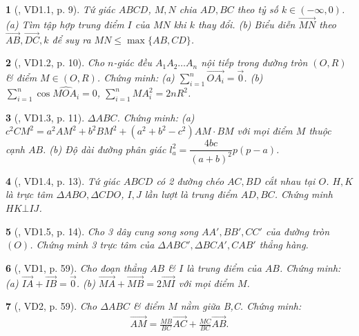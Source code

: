 \documentclass{article}
\newtheorem{baitoan}{}
\begin{document}
\begin{baitoan}[\cite{Pho_Dung_chuyen_de_Toan_PT_1}, VD1.1, p. 9]
	Tứ giác $ABCD$, $M,N$ chia $AD,BC$ theo tỷ số $k\in(-\infty,0)$. (a) Tìm tập hợp trung điểm $I$ của $MN$ khi $k$ thay đổi. (b) Biểu diễn $\overrightarrow{MN}$ theo $\overrightarrow{AB},\overrightarrow{DC},k$ để suy ra $MN\le\max\{AB,CD\}$.
\end{baitoan}

\begin{baitoan}[\cite{Pho_Dung_chuyen_de_Toan_PT_1}, VD1.2, p. 10]
	Cho $n$-giác đều $A_1A_2\ldots A_n$ nội tiếp trong đường tròn $(O,R)$ \& điểm $M\in(O,R)$. Chứng minh: (a) $\sum_{i=1}^n \overrightarrow{OA_i} = \vec{0}$. (b) $\sum_{i=1}^n \cos\widehat{MOA_i} = 0$, $\sum_{i=1}^n MA_i^2 = 2nR^2$.
\end{baitoan}

\begin{baitoan}[\cite{Pho_Dung_chuyen_de_Toan_PT_1}, VD1.3, p. 11]
	$\Delta ABC$. Chứng minh: (a) $c^2 CM^2 = a^2AM^2 + b^2BM^2 + (a^2 + b^2 - c^2)AM\cdot BM$ với mọi điểm $M$ thuộc cạnh $AB$. (b) Độ dài đường phân giác $l_a^2 = \dfrac{4bc}{(a + b)^2}p(p - a)$.
\end{baitoan}

\begin{baitoan}[\cite{Pho_Dung_chuyen_de_Toan_PT_1}, VD1.4, p. 13]
	Tứ giác $ABCD$ có 2 đường chéo $AC,BD$ cắt nhau tại $O$. $H,K$ là trực tâm $\Delta ABO,\Delta CDO$, $I,J$ lần lượt là trung điểm $AD,BC$. Chứng minh $HK\bot IJ$.
\end{baitoan}

\begin{baitoan}[\cite{Pho_Dung_chuyen_de_Toan_PT_1}, VD1.5, p. 14]
	Cho 3 dây cung song song $AA',BB',CC'$ của đường tròn $(O)$. Chứng minh 3 trực tâm của $\Delta ABC',\Delta BCA',CAB'$ thẳng hàng.
\end{baitoan}

\begin{baitoan}[\cite{Hai_Hung_Thu_Tung2022_tap_1}, VD1, p. 59]
	Cho đoạn thẳng $AB$ \& $I$ là trung điểm của $AB$. Chứng minh: (a) $\overrightarrow{IA} + \overrightarrow{IB} = \vec{0}$. (b)  $\overrightarrow{MA} + \overrightarrow{MB} = 2\overrightarrow{MI}$ với mọi điểm $M$.
\end{baitoan}

\begin{baitoan}[\cite{Hai_Hung_Thu_Tung2022_tap_1}, VD2, p. 59]
	Cho $\Delta ABC$ \& điểm $M$ nằm giữa B,C. Chứng minh:
	\begin{align*}
		\overrightarrow{AM} = \frac{MB}{BC}\overrightarrow{AC} + \frac{MC}{BC}\overrightarrow{AB}.
	\end{align*}
\end{baitoan}
\end{document}
